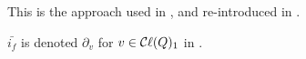 \begin{definition}



    This is the approach used in \cite{bourbaki2007}, and re-introduced in \cite{jadczyk2019notes,jadczyk2023bundle}.



    $\bar{i_f}$ is denoted $\partial_v$ for $v \in \mathop{\mathcal{C}\ell}(Q)_1$ in \cite{lundholm2009clifford}.

\end{definition}